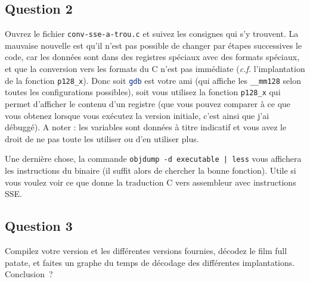 \documentclass[a4paper,12pt]{article}
\begin{document}
\subsection*{Question 2}
Ouvrez le fichier \lstinline[language=bash]{conv-sse-a-trou.c} et suivez les consignes qui s'y trouvent.
La mauvaise nouvelle est qu'il n'est pas possible de changer par étapes successives le code, car les données sont dans des registres spéciaux avec des formats spéciaux, et que la conversion vers les formats du C n'est pas immédiate (\emph{c.f.} l'implantation de la fonction \lstinline{p128_x}).
Donc soit \lstinline[language=bash]{gdb} est votre ami (qui affiche les \lstinline{__mm128} selon toutes les configurations possibles), soit vous utilisez la fonction \lstinline{p128_x} qui permet d'afficher le contenu d'un registre (que vous pouvez comparer à ce que vous obtenez lorsque vous exécutez la version initiale, c'est ainsi que j'ai débuggé). A noter : les variables sont données à titre indicatif et vous avez le droit de ne pas toute les utiliser ou d'en utiliser plus.

Une dernière chose, la commande \lstinline{objdump -d executable | less} vous affichera les instructions du binaire (il suffit alors de chercher la bonne fonction). Utile si vous voulez voir ce que donne la traduction C vers assembleur avec instructions SSE.

\subsection*{Question 3}
Compilez votre version et les différentes versions fournies, décodez le film full patate, et faites un graphe du temps de décodage des différentes implantations.
Conclusion~?
\end{document}
